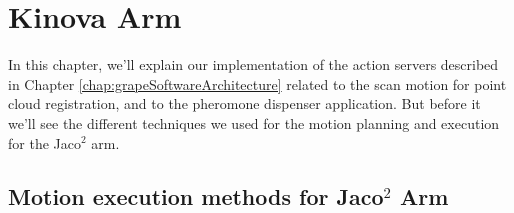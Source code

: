 
\chapter{Kinova Arm} \label{chap:kinovaArmChapter}

In this chapter, we'll explain our implementation of the action servers described in Chapter \ref{chap:grapeSoftwareArchitecture} related to the scan motion for point cloud registration, and to the pheromone dispenser application.
But before it we'll see the different techniques we used for the motion planning and execution for the Jaco$^2$ arm.

\section{Motion execution methods for Jaco$^2$ Arm}

